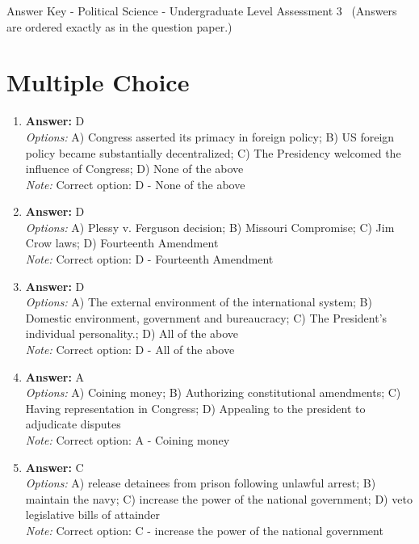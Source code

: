 \documentclass[12pt]{article}
\begin{document}
\begin{center}
Answer Key - Political Science - Undergraduate Level Assessment 3 \
\small (Answers are ordered exactly as in the question paper.)
\end{center}

\section*{Multiple Choice}
\begin{enumerate}[label=\arabic*.]
\item \textbf{Answer:} D
\\ \textit{Options:} A) Congress asserted its primacy in foreign policy; B) US foreign policy became substantially decentralized; C) The Presidency welcomed the influence of Congress; D) None of the above
\\ \textit{Note:} Correct option: D - None of the above
\item \textbf{Answer:} D
\\ \textit{Options:} A) Plessy v. Ferguson decision; B) Missouri Compromise; C) Jim Crow laws; D) Fourteenth Amendment
\\ \textit{Note:} Correct option: D - Fourteenth Amendment
\item \textbf{Answer:} D
\\ \textit{Options:} A) The external environment of the international system; B) Domestic environment, government and bureaucracy; C) The President's individual personality.; D) All of the above
\\ \textit{Note:} Correct option: D - All of the above
\item \textbf{Answer:} A
\\ \textit{Options:} A) Coining money; B) Authorizing constitutional amendments; C) Having representation in Congress; D) Appealing to the president to adjudicate disputes
\\ \textit{Note:} Correct option: A - Coining money
\item \textbf{Answer:} C
\\ \textit{Options:} A) release detainees from prison following unlawful arrest; B) maintain the navy; C) increase the power of the national government; D) veto legislative bills of attainder
\\ \textit{Note:} Correct option: C - increase the power of the national government
\end{enumerate}
\end{document}
